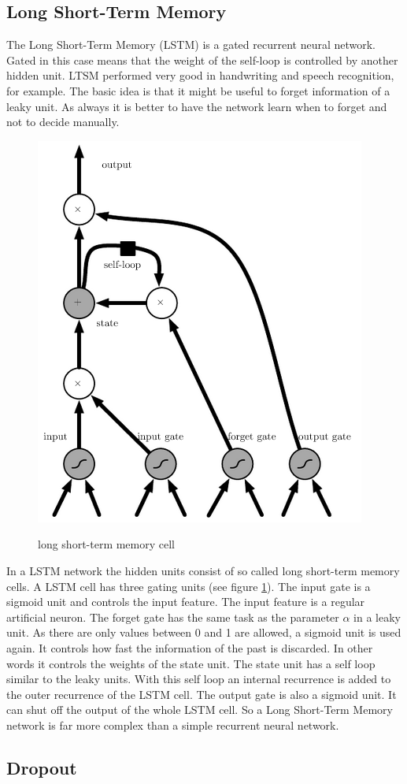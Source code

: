 \subsection{Long Short-Term Memory}
\label{sec:lstm}
The Long Short-Term Memory (LSTM) is a gated recurrent neural network. Gated in this case means that the weight of the self-loop is controlled by another hidden unit. LTSM performed very good in handwriting and speech recognition, for example. The basic idea is that it might be useful to forget information of a leaky unit. As always it is better to have the network learn when to forget and not to decide manually.\\
\begin{figure}[thb]
	\caption{long short-term memory cell \cite[p. 405]{DeepLearning}}
	\includegraphics[width=0.95\linewidth]{images/lstmCell.PNG}
	\label{fig:lstm}
\end{figure}
In a LSTM network the hidden units consist of so called long short-term memory cells. A LSTM cell has three gating units (see figure \ref{fig:lstm}). The input gate is a sigmoid unit and controls the input feature. The input feature is a regular artificial neuron. The forget gate has the same task as the parameter $\alpha$ in a leaky unit. As there are only values between 0 and 1 are allowed, a sigmoid unit is used again. It controls how fast the information of the past is discarded. In other words it controls the weights of the state unit. The state unit has a self loop similar to the leaky units. With this self loop an internal recurrence is added to the outer recurrence of the LSTM cell. The output gate is also a sigmoid unit. It can shut off the output of the whole LSTM cell. So a Long Short-Term Memory network is far more complex than a simple recurrent neural network.

\subsection{Dropout}
\label{sec:dropout}
